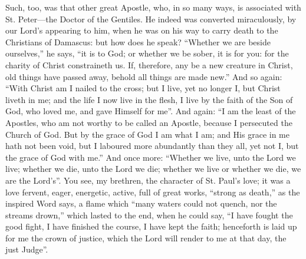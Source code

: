 Such, too, was that other great Apostle, who, in so many ways, is
associated with St. Peter—the Doctor of the Gentiles. He indeed was
converted miraculously, by our Lord's appearing to him, when he was on
his way to carry death to the Christians of Damascus: but how does he
speak? ``Whether we are beside ourselves,'' he says, ``it
is to God; or whether we be sober, it is for you: for the charity of
Christ constraineth us. If, therefore, any be a new creature in
Christ, old things have passed away, behold all things are made
new.'' And so again: ``With Christ am I nailed to the cross;
but I live, yet no longer I, but Christ liveth in me; and the life I
now live in the flesh, I live by the faith of the Son of God, who
loved me, and gave Himself for me''. And again: ``I am the
least of the Apostles, who am not worthy to be called an Apostle,
because I persecuted the Church of God. But by the grace of God I am
what I am; and His grace in me hath not been void, but I laboured more
abundantly than they all, yet not I, but the grace of God with
me.'' And once more: ``Whether we live, unto the Lord we live;
whether we die, unto the Lord we die; whether we live or whether we
die, we are the Lord's''. You see, my brethren, the character of
St. Paul's love; it was a love fervent, eager, energetic, active, full
of great works, ``strong as death,'' as the inspired Word
says, a flame which ``many waters could not quench, nor the
streams drown,'' which lasted to the end, when he could say,
``I have fought the good fight, I have finished the course, I have
kept the faith; henceforth is laid up for me the crown of justice,
which the Lord will render to me at that day, the just Judge''.

